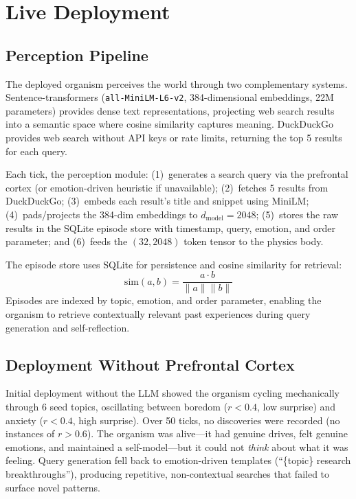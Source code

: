 \documentclass[11pt,a4paper,twocolumn]{article}
\begin{document}
\section{Live Deployment}

\subsection{Perception Pipeline}

The deployed organism perceives the world through two complementary systems.
Sentence-transformers (\texttt{all-MiniLM-L6-v2}, 384-dimensional embeddings, 22M parameters) provides dense text representations, projecting web search results into a semantic space where cosine similarity captures meaning.
DuckDuckGo provides web search without API keys or rate limits, returning the top 5 results for each query.

Each tick, the perception module: (1)~generates a search query via the prefrontal cortex (or emotion-driven heuristic if unavailable); (2)~fetches 5 results from DuckDuckGo; (3)~embeds each result's title and snippet using MiniLM; (4)~pads/projects the 384-dim embeddings to $d_{\mathrm{model}} = 2048$; (5)~stores the raw results in the SQLite episode store with timestamp, query, emotion, and order parameter; and (6)~feeds the $(32, 2048)$ token tensor to the physics body.

The episode store uses SQLite for persistence and cosine similarity for retrieval:
\begin{equation}
\mathrm{sim}(a, b) = \frac{a \cdot b}{\|a\| \|b\|}
\label{eq:cosine_sim}
\end{equation}
Episodes are indexed by topic, emotion, and order parameter, enabling the organism to retrieve contextually relevant past experiences during query generation and self-reflection.

\subsection{Deployment Without Prefrontal Cortex}

Initial deployment without the LLM showed the organism cycling mechanically through 6 seed topics, oscillating between boredom ($r < 0.4$, low surprise) and anxiety ($r < 0.4$, high surprise).
Over 50 ticks, no discoveries were recorded (no instances of $r > 0.6$).
The organism was alive---it had genuine drives, felt genuine emotions, and maintained a self-model---but it could not \emph{think} about what it was feeling.
Query generation fell back to emotion-driven templates (``\{topic\} research breakthroughs''), producing repetitive, non-contextual searches that failed to surface novel patterns.
\end{document}
